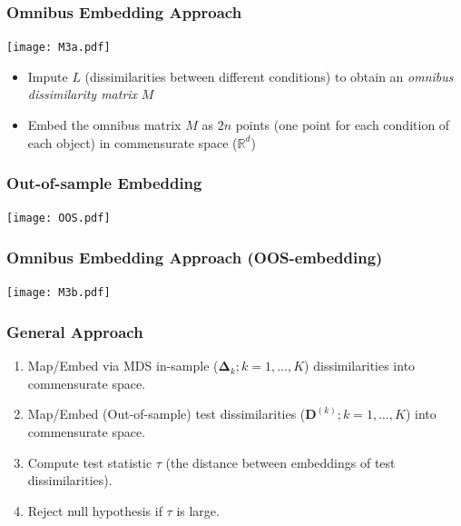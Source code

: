 \documentclass{beamer}
\begin{document}
\begin{frame}
  \frametitle{Omnibus Embedding Approach}
  \vspace*{\fill}
  \begin{center}
    \texttt{[image: M3a.pdf]}
  \end{center}
  \begin{itemize}
  \item<1-> Impute $L$ (dissimilarities between different conditions)  to obtain an {\em omnibus dissimilarity matrix} $M$
 \item<1-> Embed  the omnibus matrix $M$ as $2n$ points (one point for each condition of each object) in commensurate space ($\mathbb{R}^{d}$)
\end{itemize}
\end{frame} 
\begin{frame}
\frametitle{Out-of-sample Embedding}
\vspace*{\fill}
\begin{center}
\texttt{[image: OOS.pdf]}
\end{center}
\end{frame}




\begin{frame}
  \frametitle{Omnibus Embedding Approach (OOS-embedding)}
  \vspace*{\fill}
  \begin{center}
    \texttt{[image: M3b.pdf]}
  \end{center}
 
\end{frame}

\begin{frame}
\frametitle{General Approach}
  \vspace*{\fill}
\begin{enumerate}
\item Map/Embed via MDS in-sample ($ \bm{\Delta}_{k};
  k=1,\ldots,K$) dissimilarities into commensurate space.
\item Map/Embed (Out-of-sample)  test dissimilarities ($\mathbf{D}^{(k)};  k=1,\ldots,K$) into commensurate space.
\item Compute test statistic $\tau$ (the distance between  embeddings of test dissimilarities).
\item Reject null hypothesis if $\tau$ is large.
\end{enumerate}
\end{frame}
\end{document}
